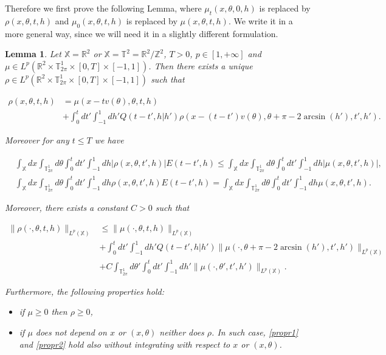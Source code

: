 \documentclass[a4paper,10pt,reqno]{amsart}
\newtheorem{lemma}{Lemma}[section]
\numberwithin{equation}{subsection}
\numberwithin{figure}{subsection}
\begin{document}
Therefore we first prove the following Lemma, where $\mu_t(x,\theta,0,h)$ is replaced by $\rho(x,\theta,t,h)$ and $\mu_0(x,\theta,t,h)$ is replaced by $\mu(x,\theta,t,h)$. We write it in a more general way, since we will need it in a slightly different formulation.
\begin{lemma}\label{lemma:rho}
Let $\mathbb{X}=\mathbb{R}^2$ or $\mathbb{X}=\mathbb{T}^2=\mathbb{R}^2/\mathbb{Z}^2$, $T>0$, $p\in[1,+\infty]$ and $\mu\in L^p(\mathbb{R}^2\times\mathbb{T}^1_{2\pi}\times[0,T]\times[-1,1])$. Then there exists a unique $\rho\in L^p(\mathbb{R}^2\times\mathbb{T}^1_{2\pi}\times[0,T]\times[-1,1])$ such that

{\small\begin{align}
\nonumber\rho(x,\theta,t,h)&=\mu(x-tv(\theta),\theta,t,h)
\\
\label{proprho}&+\int_0^tdt'\int_{-1}^1dh'Q(t-t',h|h')\rho(x-(t-t')v(\theta),\theta+\pi-2\arcsin(h'),t',h').
\end{align}}

Moreover for any $t\leq T$ we have

{\footnotesize\begin{align}
\label{propr1}&\int_{\mathbb{X}}dx\int_{\mathbb{T}^1_{2\pi}}d\theta \int_0^tdt'\int_{-1}^1dh|\rho(x,\theta,t',h)|E(t-t',h)\leq \int_{\mathbb{X}}dx\int_{\mathbb{T}^1_{2\pi}}d\theta \int_0^tdt'\int_{-1}^1dh|\mu(x,\theta,t',h)|,
\\
\label{propr2}&\int_{\mathbb{X}}dx\int_{\mathbb{T}^1_{2\pi}}d\theta \int_0^tdt'\int_{-1}^1dh\rho(x,\theta,t',h)E(t-t',h)=\int_{\mathbb{X}}dx\int_{\mathbb{T}^1_{2\pi}}d\theta \int_0^tdt'\int_{-1}^1dh\mu(x,\theta,t',h).
\end{align}}

Moreover, there exists a constant $C>0$ such that

\begin{align}
\nonumber\|\rho(\cdot,\theta,t,h)\|_{L^p(\mathbb{X})}&\leq\|\mu(\cdot,\theta,t,h)\|_{L^p(\mathbb{X})}
\\
\nonumber&+\int_0^tdt'\int_{-1}^1dh'Q(t-t',h|h')\|\mu(\cdot,\theta+\pi-2\arcsin(h'),t',h')\|_{L^p(\mathbb{X})}
\\
\label{normaLprho}&+C\int_{\mathbb{T}^1_{2\pi}}d\theta'\int_0^tdt'\int_{-1}^1dh'\|\mu(\cdot,\theta',t',h')\|_{L^p(\mathbb{X})}.
\end{align}

Furthermore, the following properties hold:
\begin{itemize}
\item if $\mu\geq0$ then $\rho\geq0$,
\item if $\mu$ does not depend on $x$ or $(x,\theta)$ neither does $\rho$. In such case, \eqref{propr1} and \eqref{propr2} hold also without integrating with respect to $x$ or $(x,\theta)$.
\end{itemize}
\end{lemma}
\end{document}
